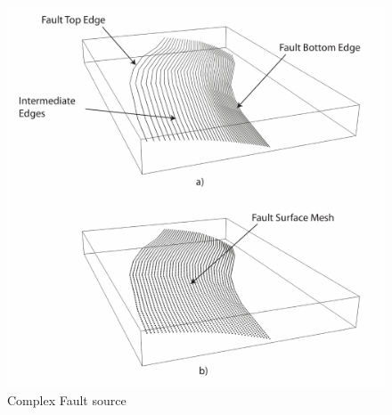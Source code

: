 \begin{figure}[!ht]
\centering
\includegraphics[width=14cm]{./Pictures/ComplexFault.pdf}
\caption{Complex Fault source}
\label{fig:ComplexFaultSource}
\end{figure}

